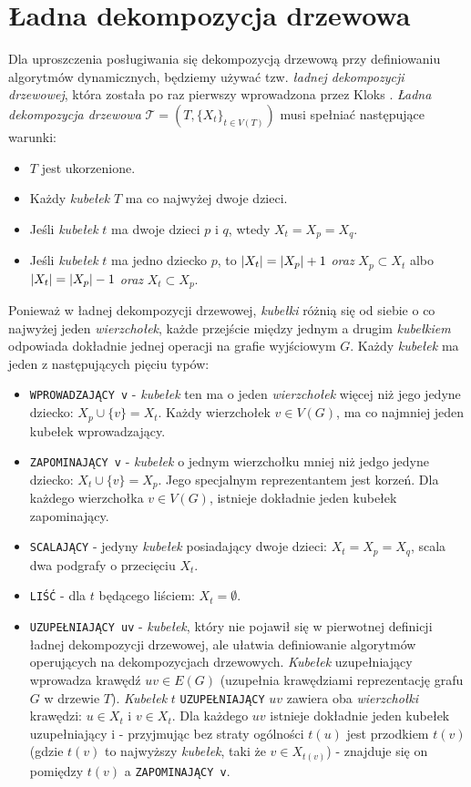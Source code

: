 \documentclass[12pt, oneside]{report}
\begin{document}
  		\section{Ładna dekompozycja drzewowa}
Dla uproszczenia posługiwania się dekompozycją drzewową przy definiowaniu algorytmów dynamicznych, będziemy używać tzw. \emph{ładnej dekompozycji drzewowej}, która została po raz pierwszy wprowadzona przez Kloks \cite{kloks}.
\newline\newline
\emph{Ładna dekompozycja drzewowa} $\mathcal{T} = (T, \{X_t\}_{t \in V(T)})$ musi spełniać następujące warunki:
\begin{itemize}
	\item{$T$ jest ukorzenione.}
	\item{Każdy \emph{kubełek} $T$ ma co najwyżej dwoje dzieci.}
	\item{Jeśli \emph{kubełek} $t$ ma dwoje dzieci $p$ i $q$, wtedy $X_t = X_p = X_q$.}
	\item{Jeśli \emph{kubełek} $t$ ma jedno dziecko $p$, to $\abs{X_t} = \abs{X_p} + 1$ \emph{oraz} $X_p \subset X_t$ albo $\abs{X_t} = \abs{X_p} - 1$ \emph{oraz} $X_t \subset X_p$.}
\end{itemize}
Ponieważ w ładnej dekompozycji drzewowej, \emph{kubełki} różnią się od siebie o co najwyżej jeden \emph{wierzchołek}, każde przejście między jednym a drugim \emph{kubełkiem} odpowiada dokładnie jednej operacji na grafie wyjściowym $G$. Każdy \emph{kubełek} ma jeden z następujących pięciu typów:
\begin{itemize}
	\item{\texttt{WPROWADZAJĄCY v} - \emph{kubełek} ten ma o jeden \emph{wierzchołek} więcej niż jego jedyne dziecko: $X_p \cup \{v\} = X_t$. Każdy wierzchołek $v \in V(G)$, ma co najmniej jeden kubełek wprowadzający.}
	\item{\texttt{ZAPOMINAJĄCY v} - \emph{kubełek} o jednym wierzchołku mniej niż jedgo jedyne dziecko: $X_t \cup \{v\} = X_p$. Jego specjalnym reprezentantem jest korzeń. Dla każdego wierzchołka $v \in V(G)$, istnieje dokładnie jeden kubełek zapominający.}
	\item{\texttt{SCALAJĄCY} - jedyny \emph{kubełek} posiadający dwoje dzieci: $X_t = X_p = X_q$, scala dwa podgrafy o przecięciu $X_t$.}
	\item{\texttt{LIŚĆ} - dla $t$ będącego liściem: $X_t = \emptyset$.}
	\item{\texttt{UZUPEŁNIAJĄCY uv} - \emph{kubełek}, który nie pojawił się w pierwotnej definicji ładnej dekompozycji drzewowej, ale ułatwia definiowanie algorytmów operujących na dekompozycjach drzewowych. \emph{Kubełek} uzupełniający wprowadza krawędź $uv \in E(G)$ (uzupełnia krawędziami reprezentację grafu $G$ w drzewie $T$). \emph{Kubełek} $t$ \texttt{UZUPEŁNIAJĄCY} $uv$ zawiera oba \emph{wierzchołki} krawędzi: $u \in X_t$ i $v \in X_t$. Dla każdego $uv$ istnieje dokładnie jeden kubełek uzupełniający i - przyjmując bez straty ogólności $t(u)$ jest przodkiem $t(v)$ (gdzie $t(v)$ to najwyższy \emph{kubełek}, taki że $v \in X_{t(v)}$) - znajduje się on pomiędzy $t(v)$ a \texttt{ZAPOMINAJĄCY v}.}
\end{itemize}
\end{document}
